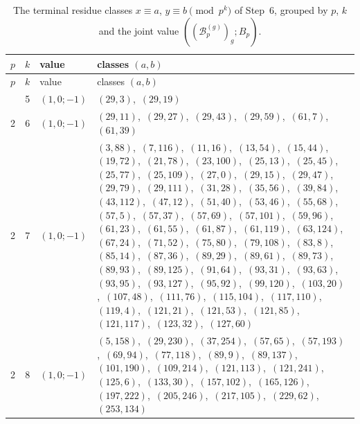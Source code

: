 \documentclass[11pt]{article}
\begin{document}
\begingroup\small
\setlength{\LTcapwidth}{\textwidth}
\begin{longtable}{@{}rrl>{\raggedright\arraybackslash}p{}@{}}
\caption{The terminal residue classes $x\equiv a$, $y\equiv b\pmod{p^k}$ of Step~6, grouped by $p$, $k$ and the joint value $((\mathcal B^{(g)}_p)_g;B_p)$.}\label{tab:local}\\
\hline $p$ & $k$ & value & classes $(a,b)$\\\hline\endfirsthead
\hline $p$ & $k$ & value & classes $(a,b)$\\\hline\endhead\hline\endfoot
2 & 5 & $(1,0;-1)$ & $(29,3)$,\allowbreak\ $(29,19)$\\
2 & 6 & $(1,0;-1)$ & $(29,11)$,\allowbreak\ $(29,27)$,\allowbreak\ $(29,43)$,\allowbreak\ $(29,59)$,\allowbreak\ $(61,7)$,\allowbreak\ $(61,39)$\\
2 & 7 & $(1,0;-1)$ & $(3,88)$,\allowbreak\ $(7,116)$,\allowbreak\ $(11,16)$,\allowbreak\ $(13,54)$,\allowbreak\ $(15,44)$,\allowbreak\ $(19,72)$,\allowbreak\ $(21,78)$,\allowbreak\ $(23,100)$,\allowbreak\ $(25,13)$,\allowbreak\ $(25,45)$,\allowbreak\ $(25,77)$,\allowbreak\ $(25,109)$,\allowbreak\ $(27,0)$,\allowbreak\ $(29,15)$,\allowbreak\ $(29,47)$,\allowbreak\ $(29,79)$,\allowbreak\ $(29,111)$,\allowbreak\ $(31,28)$,\allowbreak\ $(35,56)$,\allowbreak\ $(39,84)$,\allowbreak\ $(43,112)$,\allowbreak\ $(47,12)$,\allowbreak\ $(51,40)$,\allowbreak\ $(53,46)$,\allowbreak\ $(55,68)$,\allowbreak\ $(57,5)$,\allowbreak\ $(57,37)$,\allowbreak\ $(57,69)$,\allowbreak\ $(57,101)$,\allowbreak\ $(59,96)$,\allowbreak\ $(61,23)$,\allowbreak\ $(61,55)$,\allowbreak\ $(61,87)$,\allowbreak\ $(61,119)$,\allowbreak\ $(63,124)$,\allowbreak\ $(67,24)$,\allowbreak\ $(71,52)$,\allowbreak\ $(75,80)$,\allowbreak\ $(79,108)$,\allowbreak\ $(83,8)$,\allowbreak\ $(85,14)$,\allowbreak\ $(87,36)$,\allowbreak\ $(89,29)$,\allowbreak\ $(89,61)$,\allowbreak\ $(89,73)$,\allowbreak\ $(89,93)$,\allowbreak\ $(89,125)$,\allowbreak\ $(91,64)$,\allowbreak\ $(93,31)$,\allowbreak\ $(93,63)$,\allowbreak\ $(93,95)$,\allowbreak\ $(93,127)$,\allowbreak\ $(95,92)$,\allowbreak\ $(99,120)$,\allowbreak\ $(103,20)$,\allowbreak\ $(107,48)$,\allowbreak\ $(111,76)$,\allowbreak\ $(115,104)$,\allowbreak\ $(117,110)$,\allowbreak\ $(119,4)$,\allowbreak\ $(121,21)$,\allowbreak\ $(121,53)$,\allowbreak\ $(121,85)$,\allowbreak\ $(121,117)$,\allowbreak\ $(123,32)$,\allowbreak\ $(127,60)$\\
2 & 8 & $(1,0;-1)$ & $(5,158)$,\allowbreak\ $(29,230)$,\allowbreak\ $(37,254)$,\allowbreak\ $(57,65)$,\allowbreak\ $(57,193)$,\allowbreak\ $(69,94)$,\allowbreak\ $(77,118)$,\allowbreak\ $(89,9)$,\allowbreak\ $(89,137)$,\allowbreak\ $(101,190)$,\allowbreak\ $(109,214)$,\allowbreak\ $(121,113)$,\allowbreak\ $(121,241)$,\allowbreak\ $(125,6)$,\allowbreak\ $(133,30)$,\allowbreak\ $(157,102)$,\allowbreak\ $(165,126)$,\allowbreak\ $(197,222)$,\allowbreak\ $(205,246)$,\allowbreak\ $(217,105)$,\allowbreak\ $(229,62)$,\allowbreak\ $(253,134)$\\

\end{longtable}
\end{document}
